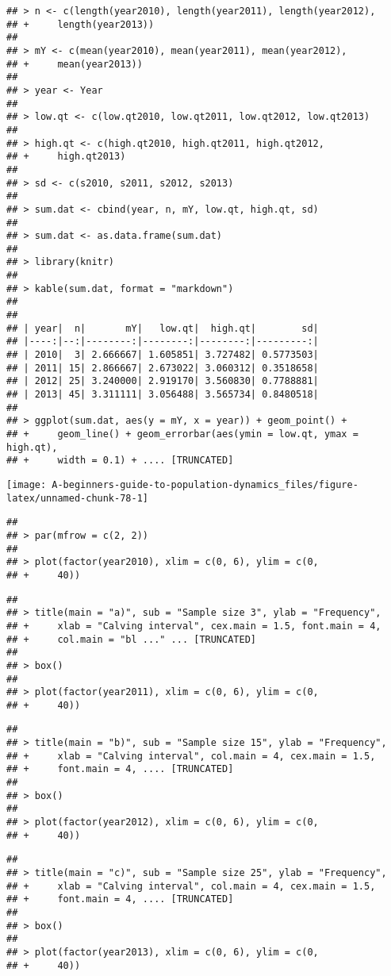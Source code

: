 \documentclass[]{book}
\begin{document}
\begin{verbatim}
## > n <- c(length(year2010), length(year2011), length(year2012), 
## +     length(year2013))
## 
## > mY <- c(mean(year2010), mean(year2011), mean(year2012), 
## +     mean(year2013))
## 
## > year <- Year
## 
## > low.qt <- c(low.qt2010, low.qt2011, low.qt2012, low.qt2013)
## 
## > high.qt <- c(high.qt2010, high.qt2011, high.qt2012, 
## +     high.qt2013)
## 
## > sd <- c(s2010, s2011, s2012, s2013)
## 
## > sum.dat <- cbind(year, n, mY, low.qt, high.qt, sd)
## 
## > sum.dat <- as.data.frame(sum.dat)
## 
## > library(knitr)
## 
## > kable(sum.dat, format = "markdown")
## 
## 
## | year|  n|       mY|   low.qt|  high.qt|        sd|
## |----:|--:|--------:|--------:|--------:|---------:|
## | 2010|  3| 2.666667| 1.605851| 3.727482| 0.5773503|
## | 2011| 15| 2.866667| 2.673022| 3.060312| 0.3518658|
## | 2012| 25| 3.240000| 2.919170| 3.560830| 0.7788881|
## | 2013| 45| 3.311111| 3.056488| 3.565734| 0.8480518|
## 
## > ggplot(sum.dat, aes(y = mY, x = year)) + geom_point() + 
## +     geom_line() + geom_errorbar(aes(ymin = low.qt, ymax = high.qt), 
## +     width = 0.1) + .... [TRUNCATED]
\end{verbatim}

\begin{center}\texttt{[image: A-beginners-guide-to-population-dynamics\_files/figure-latex/unnamed-chunk-78-1]} \end{center}

\begin{verbatim}
## 
## > par(mfrow = c(2, 2))
## 
## > plot(factor(year2010), xlim = c(0, 6), ylim = c(0, 
## +     40))
\end{verbatim}

\begin{verbatim}
## 
## > title(main = "a)", sub = "Sample size 3", ylab = "Frequency", 
## +     xlab = "Calving interval", cex.main = 1.5, font.main = 4, 
## +     col.main = "bl ..." ... [TRUNCATED] 
## 
## > box()
## 
## > plot(factor(year2011), xlim = c(0, 6), ylim = c(0, 
## +     40))
\end{verbatim}

\begin{verbatim}
## 
## > title(main = "b)", sub = "Sample size 15", ylab = "Frequency", 
## +     xlab = "Calving interval", col.main = 4, cex.main = 1.5, 
## +     font.main = 4, .... [TRUNCATED] 
## 
## > box()
## 
## > plot(factor(year2012), xlim = c(0, 6), ylim = c(0, 
## +     40))
\end{verbatim}

\begin{verbatim}
## 
## > title(main = "c)", sub = "Sample size 25", ylab = "Frequency", 
## +     xlab = "Calving interval", col.main = 4, cex.main = 1.5, 
## +     font.main = 4, .... [TRUNCATED] 
## 
## > box()
## 
## > plot(factor(year2013), xlim = c(0, 6), ylim = c(0, 
## +     40))
\end{verbatim}
\end{document}
